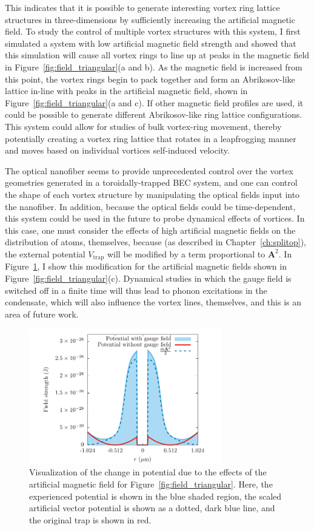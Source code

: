 This indicates that it is possible to generate interesting vortex ring lattice structures in three-dimensions by sufficiently increasing the artificial magnetic field.
To study the control of multiple vortex structures with this system, I first simulated a system with low artificial magnetic field strength and showed that this simulation will cause all vortex rings to line up at peaks in the magnetic field in Figure~\ref{fig:field_triangular}(a and b).
As the magnetic field is increased from this point, the vortex rings begin to pack together and form an Abrikosov-like lattice in-line with peaks in the artificial magnetic field, shown in Figure~\ref{fig:field_triangular}(a and c).
If other magnetic field profiles are used, it could be possible to generate different Abrikosov-like ring lattice configurations.
This system could allow for studies of bulk vortex-ring movement, thereby potentially creating a vortex ring lattice that rotates in a leapfrogging manner and moves based on individual vortices self-induced velocity.

The optical nanofiber seems to provide unprecedented control over the vortex geometries generated in a toroidally-trapped BEC system, and one can control the shape of each vortex structure by manipulating the optical fields input into the nanofiber.
In addition, because the optical fields could be time-dependent, this system could be used in the future to probe dynamical effects of vortices.
In this case, one must consider the effects of high artificial magnetic fields on the distribution of atoms, themselves, because (as described in Chapter~\ref{ch:splitop}), the external potential $V_\text{trap}$ will be modified by a term proportional to $\mathbf{A}^2$.
In Figure~\ref{fig:V_change}, I show this modification for the artificial magnetic fields shown in Figure~\ref{fig:field_triangular}(c).
Dynamical studies in which the gauge field is switched off in a finite time will thus lead to phonon excitations in the condensate, which will also influence the vortex lines, themselves, and this is an area of future work.

\begin{figure}
\center \includegraphics[width=0.75\textwidth]{data/3d/V_change.pdf}
\caption{Visualization of the change in potential due to the effects of the artificial magnetic field for Figure~\ref{fig:field_triangular}.
Here, the experienced potential is shown in the blue shaded region, the scaled artificial vector potential is shown as a dotted, dark blue line, and the original trap is shown in red.}
\label{fig:V_change}
\end{figure}

